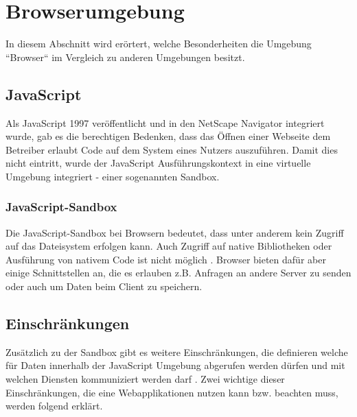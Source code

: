 \section{Browserumgebung}


In diesem Abschnitt wird erörtert, welche Besonderheiten die Umgebung ``Browser`` im Vergleich zu anderen Umgebungen besitzt.

\subsection{JavaScript}

Als JavaScript 1997 veröffentlicht und in den NetScape Navigator integriert wurde, gab es die berechtigen Bedenken, dass das Öffnen einer Webseite dem Betreiber erlaubt Code auf dem System eines Nutzers auszuführen. Damit dies nicht eintritt, wurde der JavaScript Ausführungskontext in eine virtuelle Umgebung  integriert - einer sogenannten Sandbox. \cite{LearningJavaScript}


\subsubsection{JavaScript-Sandbox}

Die JavaScript-Sandbox bei Browsern bedeutet, dass unter anderem kein Zugriff auf das Dateisystem erfolgen kann. Auch Zugriff auf native Bibliotheken oder Ausführung von nativem Code ist nicht möglich \cite{TheSpyInTheSandbox}. Browser bieten dafür aber einige Schnittstellen an, die es erlauben z.B. Anfragen an andere Server zu senden oder auch um Daten beim Client zu speichern.

\subsection{Einschränkungen}

Zusätzlich zu der Sandbox gibt es weitere Einschränkungen, die definieren welche für Daten innerhalb der JavaScript Umgebung abgerufen werden dürfen und mit welchen Diensten kommuniziert werden darf \cite{LearningJavaScript}. Zwei wichtige dieser Einschränkungen, die eine Webapplikationen nutzen kann bzw. beachten muss, werden folgend erklärt.

